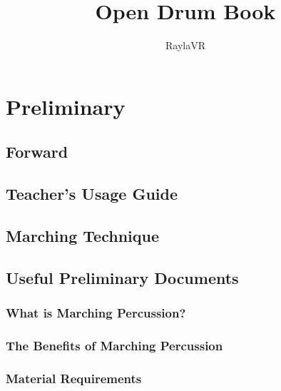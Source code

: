 \documentclass[12pt,letterpaper]{book}
\title{Open Drum Book}
\author{RaylaVR}
\begin{document}
\maketitle
\newpage
{}
\tableofcontents







\part{Preliminary}


\chapter{Forward}

\chapter{Teacher's Usage Guide}

\chapter{Marching Technique}

\chapter{Useful Preliminary Documents}

\section{What is Marching Percussion?}

\section{The Benefits of Marching Percussion}

\section{Material Requirements}
\end{document}
